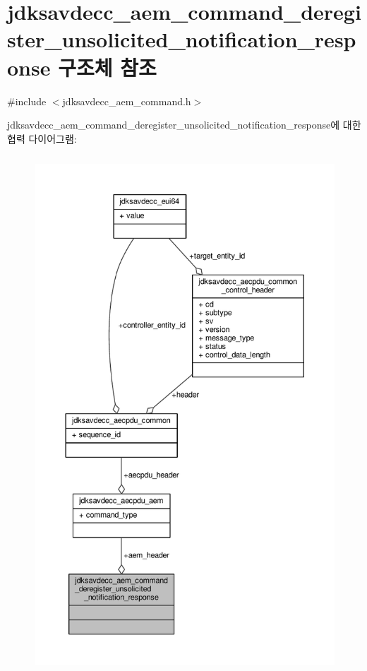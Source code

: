 \hypertarget{structjdksavdecc__aem__command__deregister__unsolicited__notification__response}{}\section{jdksavdecc\+\_\+aem\+\_\+command\+\_\+deregister\+\_\+unsolicited\+\_\+notification\+\_\+response 구조체 참조}
\label{structjdksavdecc__aem__command__deregister__unsolicited__notification__response}


{\ttfamily \#include $<$jdksavdecc\+\_\+aem\+\_\+command.\+h$>$}



jdksavdecc\+\_\+aem\+\_\+command\+\_\+deregister\+\_\+unsolicited\+\_\+notification\+\_\+response에 대한 협력 다이어그램\+:
\nopagebreak
\begin{figure}[H]
\begin{center}
\leavevmode
\includegraphics[height=550pt]{structjdksavdecc__aem__command__deregister__unsolicited__notification__response__coll__graph}
\end{center}
\end{figure}
